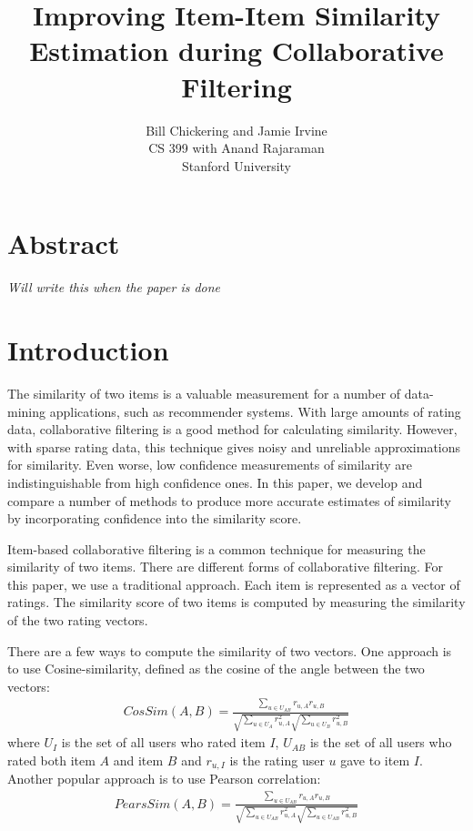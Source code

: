 \documentclass[11pt]{article}
\begin{document}

\title{Improving Item-Item Similarity Estimation during Collaborative Filtering}
\author{Bill Chickering and Jamie Irvine\\
CS 399 with Anand Rajaraman\\
Stanford University}
\renewcommand{\today}{March 25, 2014}
\maketitle

\section*{Abstract}
\emph{Will write this when the paper is done}

\section*{Introduction}
The similarity of two items is a valuable measurement for a number of
data-mining applications, such as recommender systems. With large amounts of
rating data, collaborative filtering is a good method for calculating
similarity. However, with sparse rating data, this technique gives noisy and
unreliable approximations for similarity. Even worse, low confidence
measurements of similarity are indistinguishable from high confidence ones. In
this paper, we develop and compare a number of methods to produce more accurate
estimates of similarity by incorporating confidence into the similarity score.
 
Item-based collaborative filtering is a common technique for measuring the
similarity of two items. There are different forms of collaborative filtering.
For this paper, we use a traditional approach. Each item is represented as a
vector of ratings. The similarity score of two items is computed by measuring
the similarity of the two rating vectors.

There are a few ways to compute the similarity of two vectors. One approach is
to use Cosine-similarity, defined as the cosine of the angle between the two
vectors:
\begin{align}
CosSim(A, B) = \frac{\sum\limits_{u\in U_{AB}}
r_{u,A}r_{u,B}}{\sqrt{\sum\limits_{u\in U_{A}} r_{u,A}^2}
\sqrt{\sum\limits_{u\in U_{B}} r_{u,B}^2}}
\end{align}
where $U_{I}$ is the set of all users who rated item $I$, $U_{AB}$ is the set of
all users who rated both item $A$ and item $B$ and $r_{u,I}$ is the rating user
$u$ gave to item $I$. Another popular approach is to use Pearson correlation:
\begin{align}
PearsSim(A, B) = \frac{\sum\limits_{u\in U_{AB}}
r_{u,A}r_{u,B}}{\sqrt{\sum\limits_{u\in U_{AB}} r_{u,A}^2}
\sqrt{\sum\limits_{u\in U_{AB}} r_{u,B}^2}}
\end{align}
\end{document}

